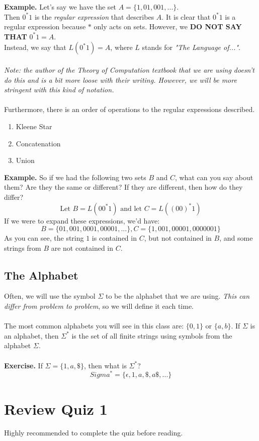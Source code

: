 \documentclass[a4paper, 12pt, margin=1.2in]{article}
\begin{document}
\textbf{Example.}
Let's say we have the set $A = \{1, 01, 001, ...\}$.\\ Then $0^*1$ is the \textit{regular expression} that describes $A$. It is clear that $0^*1$ is a regular expression because $*$ only acts on sets. However, we \textbf{DO NOT SAY THAT} $0^*1 = A$. \\Instead, we say that $\boxed{L(0^*1) = A}$, where $L$ stands for \textit{"The Language of..."}. \\ \\
\textit{Note: the author of the \textit{Theory of Computation} textbook that we are using doesn't do this and is a bit more loose with their writing. However, we will be more stringent with this kind of notation. } \\ 
\\
Furthermore, there is an order of operations to the regular expressions described. 
\begin{enumerate}
    \item Kleene Star
    \item Concatenation
    \item Union
\end{enumerate}
\textbf{Example.} So if we had the following two sets $B$ and $C$, what can you say about them? Are they the same or different? If they are different, then how do they differ? 
\[
    \text{Let }B = L(00^*1) \text{ and let } C = L((00)^*1)
\]
If we were to expand these expressions, we'd have:
\[B = \{01, 001, 0001, 00001, ...\}, C = \{1, 001, 00001, 0000001\}\]
As you can see, the string $1$ is contained in $C$, but not contained in $B$, and some strings from $B$ are not contained in $C$.
\subsection{The Alphabet}
Often, we will use the symbol $\Sigma$ to be the alphabet that we are using. \textit{This can differ from problem to problem}, so we will define it each time. \\ \\
The most common alphabets you will see in this class are: $\{0, 1\}$ or $\{a, b\}$. If $\Sigma$ is an alphabet, then $\Sigma^*$ is the set of all finite strings using symbols from the alphabet $\Sigma$. \\ \\
\textbf{Exercise.} If $\Sigma = \{1, a, \$\}$, then what is $\Sigma^*$? \\
\[
    Sigma^* = \{\epsilon, 1, a, \$, a\$, ...\}
\]
\newpage
\section{Review Quiz 1}
Highly recommended to complete the quiz before reading.
\end{document}
